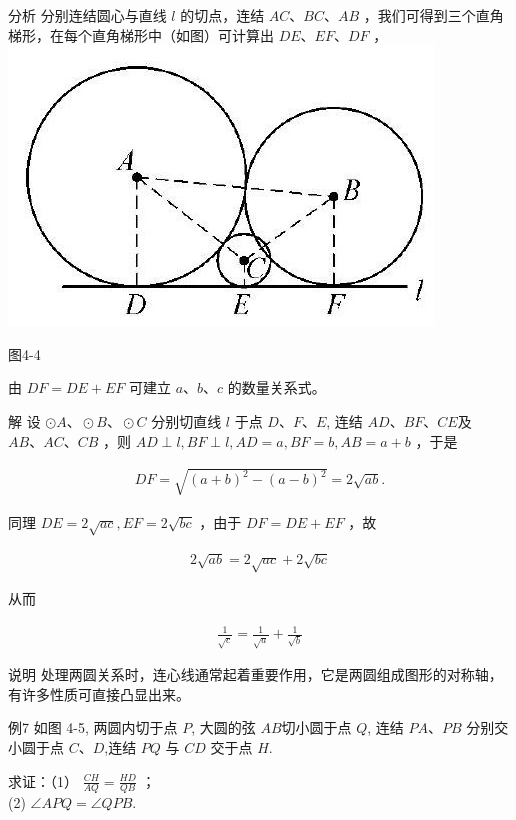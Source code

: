 \documentclass[10pt]{article}
\begin{document}
分析 分别连结圆心与直线 $l$ 的切点，连结 $A C 、 B C 、 A B$ ，我们可得到三个直角梯形，在每个直角梯形中（如图）可计算出 $D E 、 E F 、 D F$ ，\\
\includegraphics[max width=\textwidth, center]{2024_10_30_66b8e5e701da2093c133g-031}

图4-4

由 $D F=D E+E F$ 可建立 $a 、 b 、 c$ 的数量关系式。

解 设 $\odot A 、 \odot B 、 \odot C$ 分别切直线 $l$ 于点 $D 、 F 、 E$, 连结 $A D 、 B F 、 C E$及 $A B 、 A C 、 C B$ ，则 $A D \perp l, B F \perp l, A D=a, B F=b, A B=a+b$ ，于是

\begin{align*}
D F=\sqrt{(a+b)^{2}-(a-b)^{2}}=2 \sqrt{a b} .
\end{align*}

同理 $D E=2 \sqrt{a c}, E F=2 \sqrt{b c}$ ，由于 $D F=D E+E F$ ，故

\begin{align*}
2 \sqrt{a b}=2 \sqrt{a c}+2 \sqrt{b c}
\end{align*}

从而

\begin{align*}
\frac{1}{\sqrt{c}}=\frac{1}{\sqrt{a}}+\frac{1}{\sqrt{b}}
\end{align*}

说明 处理两圆关系时，连心线通常起着重要作用，它是两圆组成图形的对称轴，有许多性质可直接凸显出来。

例7 如图 4-5, 两圆内切于点 $P$, 大圆的弦 $A B$切小圆于点 $Q$, 连结 $P A 、 P B$ 分别交小圆于点 $C 、 D$,连结 $P Q$ 与 $C D$ 交于点 $H$.

求证：（1） $\frac{C H}{A Q}=\frac{H D}{Q B}$ ；\\
(2) $\angle A P Q=\angle Q P B$.
\end{document}
